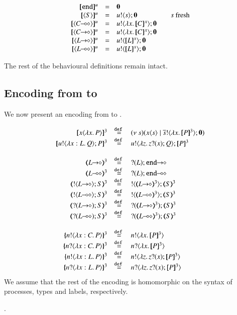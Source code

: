 \begin{definition}
\[\begin{array}{rclcl}
		\map{\tinact}^{u} &=& \inact
		\\
		\map{\chtype{S}}^{u} &=& \bout{u}{s} \inact & & s \textrm{ fresh}
		\\
		\map{\chtype{\lhot{C}}}^{u} &=& \bout{u}{\abs{x} \map{C}^{x}} \inact
		\\
		\map{\chtype{\shot{C}}}^{u} &=& \bout{u}{\abs{x} \map{C}^{x}} \inact
		\\
		\map{\chtype{\shot{L}}}^{u} &=& \bout{u}{\map{L}^x} \inact
		\\
		\map{\chtype{\lhot{L}}}^{u} &=& \bout{u}{\map{L}^x} \inact
	\end{array}
	\]
\end{definition}

The rest of the behavioural definitions remain intact. 

\subsection{Encoding from \HOpp to \HOp}

We now present an encoding from \HOpp to \HOp.

\[
\begin{array}{rcl}
	\pmap{\appl{x}{\abs{x} P}}{3} &\defeq& \newsp{s}{\appl{x}{s} \Par \bout{\dual{s}}{\abs{x} \pmap{P}{3}} \inact}
	\\
	\pmap{\bout{u}{\abs{x: L}{Q}} P}{3} &\defeq& \bout{u}{\abs{z}{\binp{z}{x} Q}} \pmap{P}{3}
	\\
	\\
	\tmap{\shot{L}}{3} &\defeq& \shot{\btinp{L} \tinact}
	\\
	\tmap{\lhot{L}}{3} &\defeq& \lhot{\btinp{L} \tinact}
	\\
	\tmap{\btout{\shot{L}} S}{3} &\defeq& \btout{\tmap{\shot{L}}{3}} \tmap{S}{3}
	\\
	\tmap{\btout{\lhot{L}} S}{3} &\defeq& \btout{\tmap{\lhot{L}}{3}} \tmap{S}{3}
	\\
	\tmap{\btinp{\shot{L}} S}{3} &\defeq& \btinp{\tmap{\shot{L}}{3}} \tmap{S}{3}
	\\
	\tmap{\btinp{\lhot{L}} S}{3} &\defeq& \btinp{\tmap{\lhot{L}}{3}} \tmap{S}{3}
	\\
	\\
	\mapa{\bactout{n}{\abs{x:C}{P}}}^{3} &\defeq& \bactout{n}{\abs{x}{\pmap{P}{3}}}
	\\
	\mapa{\bactinp{n}{\abs{x:C}{P}}}^{3} &\defeq& \bactinp{n}{\abs{x}{\pmap{P}{3}}}
	\\
	\mapa{\bactout{n}{\abs{x:L}{P}}}^{3} &\defeq& \bactout{n}{\abs{z}{\binp{z}{x} \pmap{P}{3}}}
	\\
	\mapa{\bactinp{n}{\abs{x:L}{P}}}^{3} &\defeq& \bactinp{n}{\abs{z}{\binp{z}{x} \pmap{P}{3}}}

\end{array}
\]
\noi We assume that the rest of the encoding is homomorphic on the syntax of
processes, types and labels, respectively.

.
